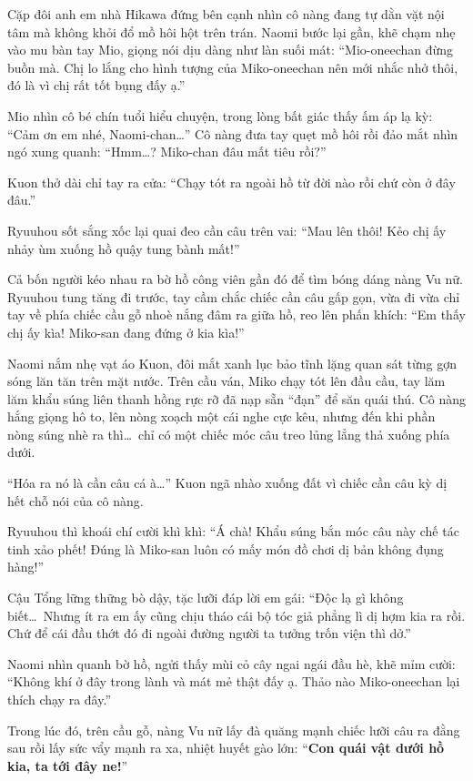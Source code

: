 \documentclass[../main.tex]{subfiles}
\begin{document}
Cặp đôi anh em nhà Hikawa đứng bên cạnh nhìn cô nàng đang tự dằn vặt nội tâm mà không khỏi đổ mồ hôi hột trên trán. Naomi bước lại gần, khẽ chạm nhẹ vào mu bàn tay Mio, giọng nói dịu dàng như làn suối mát: ``Mio-oneechan đừng buồn mà. Chị lo lắng cho hình tượng của Miko-oneechan nên mới nhắc nhở thôi, đó là vì chị rất tốt bụng đấy ạ.''

Mio nhìn cô bé chín tuổi hiểu chuyện, trong lòng bất giác thấy ấm áp lạ kỳ: ``Cảm ơn em nhé, Naomi-chan\dots'' Cô nàng đưa tay quẹt mồ hôi rồi đảo mắt nhìn ngó xung quanh: ``Hmm\dots? Miko-chan đâu mất tiêu rồi?''

Kuon thở dài chỉ tay ra cửa: ``Chạy tót ra ngoài hồ từ đời nào rồi chứ còn ở đây đâu.''

Ryuuhou sốt sắng xốc lại quai đeo cần câu trên vai: ``Mau lên thôi! Kẻo chị ấy nhảy ùm xuống hồ quậy tung bành mất!''

\ct

Cả bốn người kéo nhau ra bờ hồ công viên gần đó để tìm bóng dáng nàng Vu nữ. Ryuuhou tung tăng đi trước, tay cầm chắc chiếc cần câu gấp gọn, vừa đi vừa chỉ tay về phía chiếc cầu gỗ nhoè nắng đâm ra giữa hồ, reo lên phấn khích: ``Em thấy chị ấy kìa! Miko-san đang đứng ở kia kìa!''

Naomi nắm nhẹ vạt áo Kuon, đôi mắt xanh lục bảo tĩnh lặng quan sát từng gợn sóng lăn tăn trên mặt nước. Trên cầu ván, Miko chạy tót lên đầu cầu, tay lăm lăm khẩu súng liên thanh hồng rực rỡ đã nạp sẵn ``đạn'' để săn quái thú. Cô nàng hắng giọng hô to, lên nòng xoạch một cái nghe cực kêu, nhưng đến khi phần nòng súng nhè ra thì\dots\ chỉ có một chiếc móc câu treo lủng lẳng thả xuống phía dưới.

``Hóa ra nó là cần câu cá à\dots'' Kuon ngã nhào xuống đất vì chiếc cần câu kỳ dị hết chỗ nói của cô nàng.

Ryuuhou thì khoái chí cười khì khì: ``Á chà! Khẩu súng bắn móc câu này chế tác tinh xảo phết! Đúng là Miko-san luôn có mấy món đồ chơi dị bản không đụng hàng!''

Cậu Tổng lững thững bò dậy, tặc lưỡi đáp lời em gái: ``Độc lạ gì không biết\dots\ Nhưng ít ra em ấy cũng chịu tháo cái bộ tóc giả phẳng lì dị hợm kia ra rồi. Chứ để cái đầu thớt đó đi ngoài đường người ta tưởng trốn viện thì dở.''

Naomi nhìn quanh bờ hồ, ngửi thấy mùi cỏ cây ngai ngái đầu hè, khẽ mỉm cười: ``Không khí ở đây trong lành và mát mẻ thật đấy ạ. Thảo nào Miko-oneechan lại thích chạy ra đây.''

Trong lúc đó, trên cầu gỗ, nàng Vu nữ lấy đà quăng mạnh chiếc lưỡi câu ra đằng sau rồi lấy sức vẩy mạnh ra xa, nhiệt huyết gào lớn: ``\textbf{Con quái vật dưới hồ kia, ta tới đây ne!}''
\end{document}

